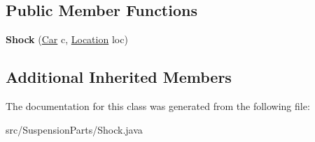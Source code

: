 \subsection*{Public Member Functions}
\begin{DoxyCompactItemize}
\item 
\hypertarget{classSuspensionParts_1_1Shock_a585cb108af7a7e48c825df94e0196b7d}{}{\bfseries Shock} (\hyperlink{classCars_1_1Car}{Car} c, \hyperlink{enumEnums_1_1Location}{Location} loc)\label{classSuspensionParts_1_1Shock_a585cb108af7a7e48c825df94e0196b7d}

\end{DoxyCompactItemize}
\subsection*{Additional Inherited Members}


The documentation for this class was generated from the following file\+:\begin{DoxyCompactItemize}
\item 
src/\+Suspension\+Parts/Shock.\+java\end{DoxyCompactItemize}
